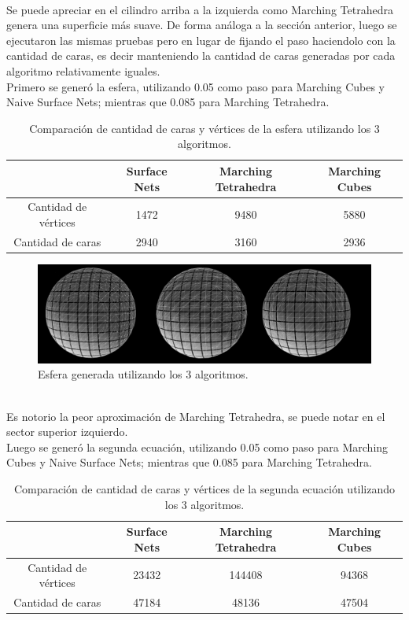 \documentclass[12pt]{article}
\begin{document}
\\Se puede apreciar en el cilindro arriba a la izquierda como Marching Tetrahedra genera una superficie más suave.
\clearpage
De forma análoga a la sección anterior, luego se ejecutaron las mismas pruebas pero en lugar de fijando el paso haciendolo con la cantidad de caras, es decir manteniendo la cantidad de caras generadas por cada algoritmo relativamente iguales.
\\Primero se generó la esfera, utilizando 0.05 como paso para Marching Cubes y Naive Surface Nets; mientras que 0.085 para Marching Tetrahedra.
\begin{table}[h!]
  \centering
  \label{tab:table1}
  \begin{tabular}{cccc}
    \toprule
    & Surface Nets & Marching Tetrahedra & Marching Cubes\\
    \midrule
    Cantidad de vértices & 1472 & 9480  & 5880 \\
    Cantidad de caras &  2940 & 3160 & 2936 \\
    \bottomrule
  \end{tabular}
  \caption{Comparación de cantidad de caras y vértices de la esfera utilizando los 3 algoritmos.}
\end{table}
\begin{figure}[h!]
\includegraphics[width=\linewidth,center]{esfera2.png}
\caption{Esfera generada utilizando los 3 algoritmos.}
\end{figure}
\\Es notorio la peor aproximación de Marching Tetrahedra, se puede notar en el sector superior izquierdo.
\\Luego se generó la segunda ecuación, utilizando 0.05 como paso para Marching Cubes y Naive Surface Nets; mientras que 0.085 para Marching Tetrahedra.
\begin{table}[h!]
  \centering
  \label{tab:table1}
  \begin{tabular}{cccc}
    \toprule
    & Surface Nets & Marching Tetrahedra & Marching Cubes\\
    \midrule
    Cantidad de vértices & 23432 & 144408  & 94368 \\
    Cantidad de caras &  47184 & 48136 & 47504 \\
    \bottomrule
  \end{tabular}
  \caption{Comparación de cantidad de caras y vértices de la segunda ecuación utilizando los 3 algoritmos.}
\end{table}
\end{document}
